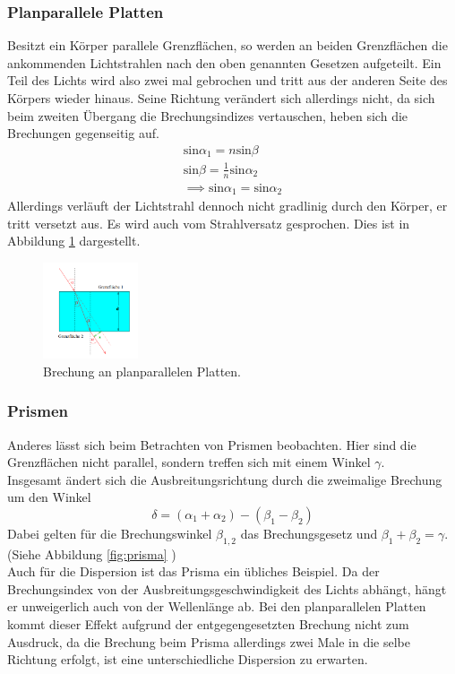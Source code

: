 \subsubsection{Planparallele Platten}
Besitzt ein Körper parallele Grenzflächen, so werden an beiden Grenzflächen
die ankommenden Lichtstrahlen nach den oben genannten Gesetzen aufgeteilt.
Ein Teil des Lichts wird also zwei mal gebrochen und tritt aus der anderen Seite
des Körpers wieder hinaus. Seine Richtung verändert sich allerdings nicht,
da sich beim zweiten Übergang die Brechungsindizes vertauschen, heben sich die
Brechungen gegenseitig auf.
\begin{align*}
    \text{sin}\alpha_1 = n \text{sin}\beta \\
    \text{sin}\beta = \frac{1}{n} \text{sin}\alpha_2\\
    \implies \text{sin}\alpha_1 = \text{sin}\alpha_2
\end{align*}
Allerdings verläuft der Lichtstrahl dennoch nicht gradlinig durch den Körper,
er tritt versetzt aus. Es wird auch vom Strahlversatz gesprochen. Dies ist 
in Abbildung \ref{fig:platten} dargestellt.

\begin{figure}
    \centering
    \includegraphics[width=0.25\textwidth]{parallel.png}
    \caption{Brechung an planparallelen Platten.}
    \label{fig:platten}
\end{figure}

\subsubsection{Prismen}
Anderes lässt sich beim Betrachten von Prismen beobachten. Hier sind die 
Grenzflächen nicht parallel, sondern treffen sich mit einem Winkel $\gamma$.\\
Insgesamt ändert sich die Ausbreitungsrichtung
durch die zweimalige Brechung um den Winkel
\begin{equation}
    \delta = \left( \alpha_1 + \alpha_2 \right) - \left( \beta_1 - \beta_2 \right)
    \label{eqn:prisma}
\end{equation}
Dabei gelten für die Brechungswinkel $\beta_{1, 2}$ das Brechungsgesetz und $\beta_1 + \beta_2 = \gamma$.
(Siehe Abbildung \ref{fig:prisma} )\\
Auch für die Dispersion ist das Prisma ein übliches Beispiel. Da der Brechungsindex
von der Ausbreitungsgeschwindigkeit des Lichts abhängt, hängt er unweigerlich auch
von der Wellenlänge ab. Bei den planparallelen Platten kommt dieser Effekt 
aufgrund der entgegengesetzten Brechung nicht zum Ausdruck, 
da die Brechung beim Prisma allerdings zwei Male in die selbe Richtung 
erfolgt, ist eine unterschiedliche Dispersion zu erwarten.

